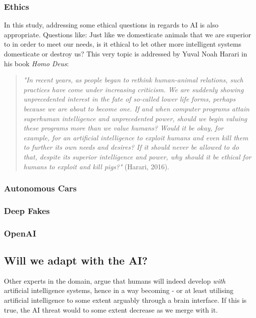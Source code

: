 \documentclass[
a4paper,
11pt,
english
]{report}
\begin{document}
\subsubsection{Ethics}
In this study, addressing some ethical questions in regards to AI is also appropriate. Questions like: Just like we domesticate animals that we are superior to in order to meet our needs, is it ethical to let other more intelligent systems domesticate or destroy us? This very topic is addressed by Yuval Noah Harari in his book \textit{Homo Deus}:

\begin{quote}
    \textit{"In recent years, as people began to rethink human-animal relations, such practices have come under increasing criticism. We are suddenly showing unprecedented interest in the fate of so-called lower life forms, perhaps because we are about to become one. If and when computer programs attain superhuman intelligence and unprecedented power, should we begin valuing these programs more than we value humans? Would it be okay, for example, for an artificial intelligence to exploit humans and even kill them to further its own needs and desires? If it should never be allowed to do that, despite its superior intelligence and power, why should it be ethical for humans to exploit and kill pigs?"} (Harari, 2016).
\end{quote}

\subsubsection{Autonomous Cars}
\subsubsection{Deep Fakes}
\subsubsection{OpenAI}

\subsection{Will we adapt with the AI?}
Other experts in the domain, argue that humans will indeed develop \textit{with} artificial intelligence systems, hence in a way becoming - or at least utilising artificial intelligence to some extent arguably through a brain interface. If this is true, the AI threat would to some extent decrease as we merge with it.
\end{document}
